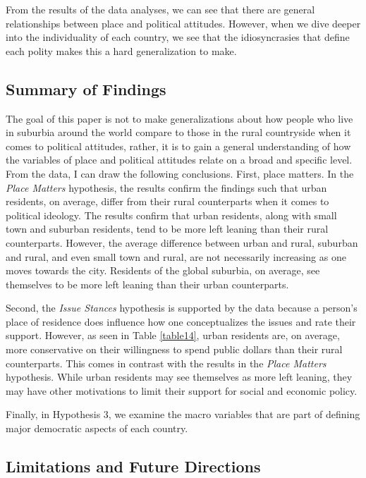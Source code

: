 \documentclass[12pt, titlepage]{article}
\newcommand\e{\emph}
\begin{document}
From the results of the data analyses, we can see that there are general relationships between place and political attitudes. However, when we dive deeper into the individuality of each country, we see that the idiosyncrasies that define each polity makes this a hard generalization to make. 

\subsection{Summary of Findings}

The goal of this paper is not to make generalizations about how people who live in suburbia around the world compare to those in the rural countryside when it comes to political attitudes, rather, it is to gain a general understanding of how the variables of place and political attitudes relate on a broad and specific level. From the data, I can draw the following conclusions. First, place matters. In the \e{Place Matters} hypothesis, the results confirm the findings such that urban residents, on average, differ from their rural counterparts when it comes to political ideology. The results confirm that urban residents, along with small town and suburban residents, tend to be more left leaning than their rural counterparts. However, the average difference between urban and rural, suburban and rural, and even small town and rural, are not necessarily increasing as one moves towards the city. Residents of the global suburbia, on average, see themselves to be more left leaning than their urban counterparts.

Second, the \e{Issue Stances} hypothesis is supported by the data because a person's place of residence does influence how one conceptualizes the issues and rate their support. However, as seen in Table \ref{table14}, urban residents are, on average, more conservative on their willingness to spend public dollars than their rural counterparts. This comes in contrast with the results in the \e{Place Matters} hypothesis. While urban residents may see themselves as more left leaning, they may have other motivations to limit their support for social and economic policy.

Finally, in Hypothesis 3, we examine the macro variables that are part of defining major democratic aspects of each country.

\subsection{Limitations and Future Directions}
\end{document}
